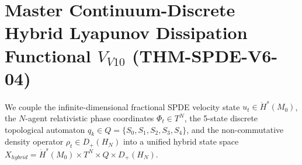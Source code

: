 \documentclass[11pt,a4paper,reqno]{article}
\def\bm#1{#1}%
\def\texttt#1{#1}%
\def\mathrm#1{#1}%
\def\mathcal#1{#1}%
\def\mathbb#1{#1}%
\theoremstyle{plain}
\theoremstyle{definition}
\theoremstyle{remark}
\numberwithin{equation}{section}
\begin{document}
\section{Master Continuum-Discrete Hybrid Lyapunov Dissipation Functional \texorpdfstring{$\mathcal{V}_{\mathrm{V10}}$}{V\_V10} (\texttt{THM-SPDE-V6-04})}
\label{sec:spde_master_lyapunov}

We couple the infinite-dimensional fractional SPDE velocity state $\bm{u}_t \in \dot{H}^s(\mathcal{M}_0)$, the $N$-agent relativistic phase coordinates $\bm{\Phi}_t \in \mathbb{T}^N$, the 5-state discrete topological automaton $q_k \in Q = \{S_0, S_1, S_2, S_3, S_4\}$, and the non-commutative density operator $\rho_t \in \mathcal{D}_+(\mathcal{H}_N)$ into a unified hybrid state space $\mathcal{X}_{\mathrm{hybrid}} = \dot{H}^s(\mathcal{M}_0) \times \mathbb{T}^N \times Q \times \mathcal{D}_+(\mathcal{H}_N)$.
\end{document}
